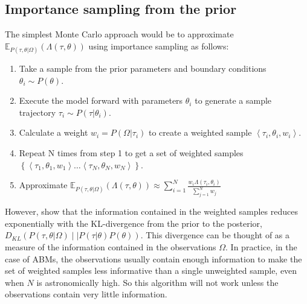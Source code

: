 \documentclass{article}
\begin{document}
\subsection{Importance sampling from the prior}
The simplest Monte Carlo approach would be to approximate $\mathbb{E}_{P(\tau,\theta|\Omega)}(\Lambda(\tau,\theta))$ using importance sampling as follows:
\begin{enumerate}
\item Take a sample from the prior parameters and boundary conditions $\theta_i \sim P(\theta)$.
\item Execute the model forward with parameters $\theta_i$ to generate a sample trajectory $\tau_{i} \sim P(\tau|\theta_i)$.
\item Calculate a weight $w_i = P(\Omega|\tau_i)$ to create a weighted sample $\left<\tau_{i},\theta_i, w_i\right>$.
\item Repeat  N times from step 1 to get a set of weighted samples $\left\{\left<\tau_1,\theta_1,w_1\right> \dots \left<\tau_N,\theta_N,w_N\right> \right\}$.
\item Approximate $\mathbb{E}_{P(\tau,\theta|\Omega)}(\Lambda(\tau,\theta)) \approx \sum_{i=1}^N \frac{w_i\Lambda(\tau_i,\theta_i) }{\sum_{j=1}^Nw_j}$
\end{enumerate}

However, \citet{chatterjee2018sample} show that the information contained in the weighted samples reduces exponentially with the KL-divergence from the prior to the posterior, $D_{KL}\left(P(\tau,\theta|\Omega) \mid\mid P(\tau|\theta)P(\theta) \right)$. This divergence can be thought of as a measure of the information contained in the observations $\Omega$. In practice, in the case of ABMs, the observations usually contain enough information to make the set of weighted samples less informative than a single unweighted sample, even when $N$ is astronomically high. So this algorithm will not work unless the observations contain very little information.
\end{document}
